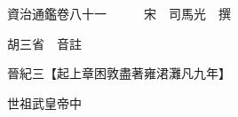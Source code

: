 










 


 
 


 

  
  
  
  
  





  
  
  
  
  
 
  

  

  
  
  



  

 
 

  
   




  

  
  


  　　資治通鑑卷八十一　　　宋　司馬光　撰

　　胡三省　音註

　　晉紀三【起上章困敦盡著雍涒灘凡九年】

　　世祖武皇帝中

